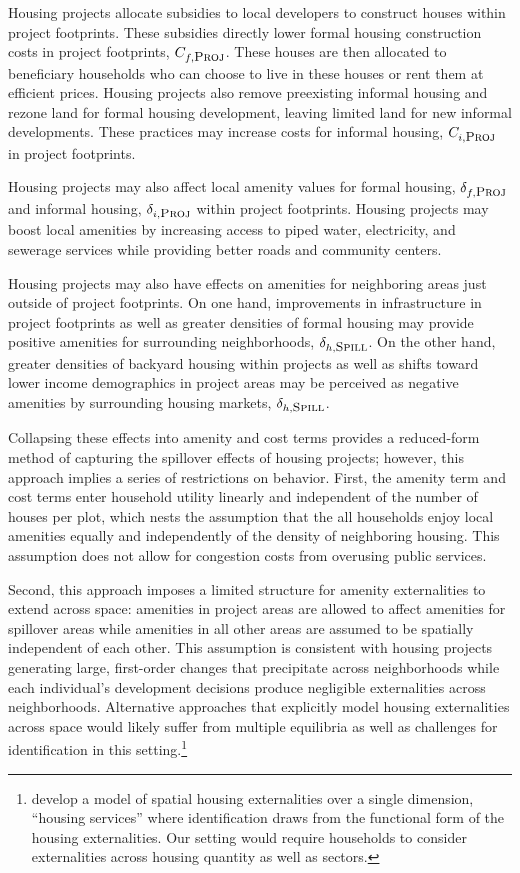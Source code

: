 \documentclass[12pt]{article}
\begin{document}
Housing projects allocate subsidies to local developers to construct houses within project footprints.  These subsidies directly lower formal housing construction costs in project footprints, $C_{f,\textsc{\small Proj}}$.  These houses are then allocated to beneficiary households who can choose to live in these houses or rent them at efficient prices.  Housing projects also remove preexisting informal housing and rezone land for formal housing development, leaving limited land for new informal developments.  These practices may increase costs for informal housing, $C_{i,\textsc{\small Proj}}$ in project footprints.

Housing projects may also affect local amenity values for formal housing, $\delta_{f,\textsc{\small Proj}}$ and informal housing, $\delta_{i,\textsc{\small Proj}}$ within project footprints.  Housing projects may boost local amenities by increasing access to piped water, electricity, and sewerage services while providing better roads and community centers.  

Housing projects may also have effects on amenities for neighboring areas just outside of project footprints.  On one hand, improvements in infrastructure in project footprints as well as greater densities of formal housing may provide positive amenities for surrounding neighborhoods, $\delta_{h,\textsc{\small Spill}}$.  On the other hand, greater densities of backyard housing within projects as well as shifts toward lower income demographics in project areas may be perceived as negative amenities by surrounding housing markets, $\delta_{h,\textsc{\small Spill}}$.  

Collapsing these effects into amenity and cost terms provides a reduced-form method of capturing the spillover effects of housing projects; however, this approach implies a series of restrictions on behavior.  First, the amenity term and cost terms enter household utility linearly and independent of the number of houses per plot, which nests the assumption that the all households enjoy local amenities equally and independently of the density of neighboring housing.  This assumption does not allow for congestion costs from overusing public services.

Second, this approach imposes a limited structure for amenity externalities to extend across space:  amenities in project areas are allowed to affect amenities for spillover areas while amenities in all other areas are assumed to be spatially independent of each other.  This assumption is consistent with housing projects generating large, first-order changes that precipitate across neighborhoods while each individual's development decisions produce negligible externalities across neighborhoods.  Alternative approaches that explicitly model housing externalities across space would likely suffer from multiple equilibria as well as challenges for identification in this setting.\footnote{\cite{rossi2010housing} develop a model of spatial housing externalities over a single dimension, ``housing services'' where identification draws from the functional form of the housing externalities.  Our setting would require households to consider externalities across housing quantity as well as sectors.}
\end{document}
